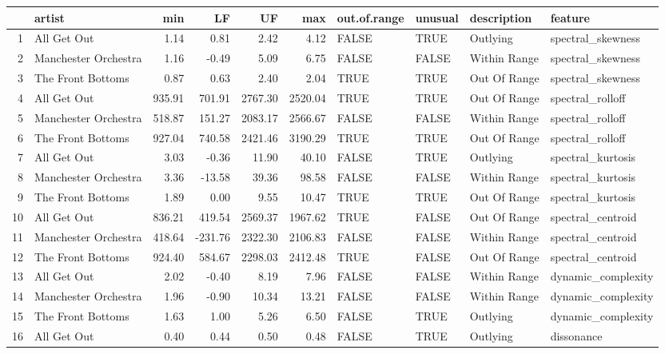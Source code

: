 \documentclass{article}\usepackage[]{graphicx}\usepackage[]{xcolor}
\begin{document}
\begin{table}[ht]
\centering
\begin{tabular}{rlrrrrllll}
  \hline
 & artist & min & LF & UF & max & out.of.range & unusual & description & feature \\ 
  \hline
1 & All Get Out & 1.14 & 0.81 & 2.42 & 4.12 & FALSE & TRUE & Outlying & spectral\_skewness \\ 
  2 & Manchester Orchestra & 1.16 & -0.49 & 5.09 & 6.75 & FALSE & FALSE & Within Range & spectral\_skewness \\ 
  3 & The Front Bottoms & 0.87 & 0.63 & 2.40 & 2.04 & TRUE & TRUE & Out Of Range & spectral\_skewness \\ 
  4 & All Get Out & 935.91 & 701.91 & 2767.30 & 2520.04 & TRUE & TRUE & Out Of Range & spectral\_rolloff \\ 
  5 & Manchester Orchestra & 518.87 & 151.27 & 2083.17 & 2566.67 & FALSE & FALSE & Within Range & spectral\_rolloff \\ 
  6 & The Front Bottoms & 927.04 & 740.58 & 2421.46 & 3190.29 & TRUE & TRUE & Out Of Range & spectral\_rolloff \\ 
  7 & All Get Out & 3.03 & -0.36 & 11.90 & 40.10 & FALSE & TRUE & Outlying & spectral\_kurtosis \\ 
  8 & Manchester Orchestra & 3.36 & -13.58 & 39.36 & 98.58 & FALSE & FALSE & Within Range & spectral\_kurtosis \\ 
  9 & The Front Bottoms & 1.89 & 0.00 & 9.55 & 10.47 & TRUE & TRUE & Out Of Range & spectral\_kurtosis \\ 
  10 & All Get Out & 836.21 & 419.54 & 2569.37 & 1967.62 & TRUE & FALSE & Out Of Range & spectral\_centroid \\ 
  11 & Manchester Orchestra & 418.64 & -231.76 & 2322.30 & 2106.83 & FALSE & FALSE & Within Range & spectral\_centroid \\ 
  12 & The Front Bottoms & 924.40 & 584.67 & 2298.03 & 2412.48 & TRUE & FALSE & Out Of Range & spectral\_centroid \\ 
  13 & All Get Out & 2.02 & -0.40 & 8.19 & 7.96 & FALSE & FALSE & Within Range & dynamic\_complexity \\ 
  14 & Manchester Orchestra & 1.96 & -0.90 & 10.34 & 13.21 & FALSE & FALSE & Within Range & dynamic\_complexity \\ 
  15 & The Front Bottoms & 1.63 & 1.00 & 5.26 & 6.50 & FALSE & TRUE & Outlying & dynamic\_complexity \\ 
  16 & All Get Out & 0.40 & 0.44 & 0.50 & 0.48 & FALSE & TRUE & Outlying & dissonance \\ 

\end{tabular}
\end{table}
\end{document}
